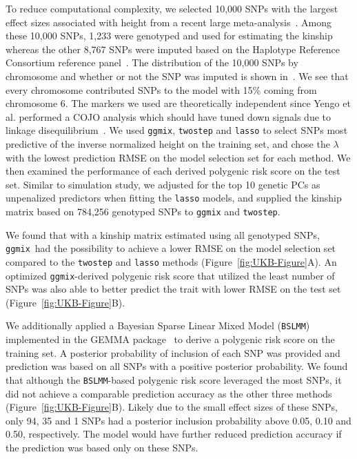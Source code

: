 \documentclass[10pt,letterpaper]{article}
\newcommand{\ggmix}{\texttt{ggmix}}
\begin{document}
To reduce computational complexity, we selected 10,000 SNPs with the largest effect sizes associated with height from a recent large meta-analysis~\cite{yengo2018meta}. Among these 10,000 SNPs, 1,233 were genotyped and used for estimating the kinship whereas the other 8,767 SNPs were imputed based on the Haplotype Reference Consortium reference panel~\cite{mccarthy2016reference}. The distribution of the 10,000 SNPs by chromosome and whether or not the SNP was imputed is shown in~. We see that every chromosome contributed SNPs to the model with 15\% coming from chromosome 6. The markers we used are theoretically independent since Yengo et al. performed a COJO analysis which should have tuned down signals due to linkage disequilibrium~\cite{yengo2018meta}. We used \ggmix, \texttt{twostep} and \texttt{lasso} to select SNPs most predictive of the inverse normalized height on the training set, and chose the $\lambda$ with the lowest prediction RMSE on the model selection set for each method. We then examined the performance of each derived polygenic risk score on the test set. Similar to simulation study, we adjusted for the top 10 genetic PCs as unpenalized predictors when fitting the \texttt{lasso} models, and supplied the kinship matrix based on 784,256 genotyped SNPs to \texttt{ggmix} and \texttt{twostep}.

We found that with a kinship matrix estimated using all genotyped SNPs, \ggmix ~had the possibility to achieve a 
lower RMSE on the model selection set compared to the \texttt{twostep} and \texttt{lasso} methods (Figure~\ref{fig:UKB-Figure}A). 
An optimized \ggmix-derived polygenic risk score that utilized the least number of SNPs was also able to better predict the trait with 
lower RMSE on the test set (Figure~\ref{fig:UKB-Figure}B).

We additionally applied a Bayesian Sparse Linear Mixed Model (\texttt{BSLMM})~\cite{zhou2013polygenic} implemented in the GEMMA package~\cite{zhou2012genome} to derive a polygenic risk score on the training set. A posterior probability of inclusion of each SNP was provided and prediction was based on all SNPs with a positive posterior probability. We found that although the \texttt{BSLMM}-based polygenic risk score leveraged the most SNPs, it did not achieve a comparable prediction accuracy as the other three methods (Figure~\ref{fig:UKB-Figure}B). Likely due to the small effect sizes of these SNPs, only 94, 35 and 1 SNPs had a posterior inclusion probability above 0.05, 0.10 and 0.50, respectively. The model would have further reduced prediction accuracy if the prediction was based only on these SNPs.
\end{document}
